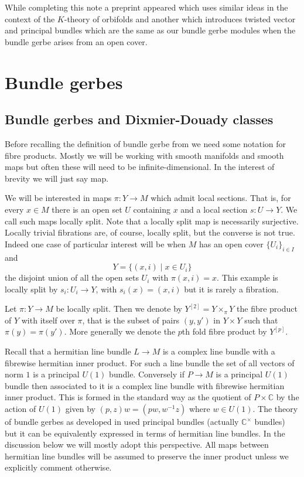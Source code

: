 \documentclass[a4paper,reqno]{amsart}
\theoremstyle{plain}
\theoremstyle{definition}
\theoremstyle{remark}
\numberwithin{equation}{section}
\numberwithin{figure}{section}
\newcommand{\CC}{{\mathbb C}}
\newcommand{\<}{\langle}
\renewcommand{\>}{\rangle}
\begin{document}
While completing this note a preprint \cite{LupUri} appeared which
uses similar ideas in the context of the $K$-theory of orbifolds and
another \cite{Mac} which introduces twisted vector and principal
bundles which are the same as our bundle gerbe modules when the bundle
gerbe arises from an open cover.


\section{Bundle gerbes}
\label{bundle_gerbes}

\subsection{Bundle gerbes and Dixmier-Douady classes}

Before recalling the definition of bundle gerbe from \cite{Mur} we
need some notation for fibre products.  Mostly we will be working with
smooth manifolds and smooth maps but often these will need to be
infinite-dimensional. In the interest of brevity we will just say map.


We will be interested in maps  $\pi \colon Y \to M$ which admit local
sections.  That is, for every $x \in M$ there is an open set $U  $
containing $x$ and  a local section $s \colon U \to Y$.
          We call such maps locally split.   Note that a locally split map is
necessarily
surjective.  
Locally trivial fibrations are, of course, locally split, but the
converse is not true. Indeed one case of particular
interest will be when $M$ has an open cover $\{U_i \}_{i \in I}$ and
$$
Y = \{ (x, i) \mid x \in U_i \}
$$
the
disjoint union of all the open sets $U_i$ with $\pi(x, i) =x$.
          This example is locally split by $s_i \colon U_i \to Y$, with
$s_i(x) = (x, i)$ but it is rarely a fibration.


Let $\pi \colon Y \to M$ be locally split. Then we denote by
          $Y^{[2]} = Y\times_\pi Y$ the fibre product
of $Y$ with itself over $\pi$,
          that is the subset of pairs $(y, y')$ in
$Y \times Y$ such that $\pi(y) = \pi(y')$.  More generally we denote
the $p$th fold fibre product by $Y^{[p]}$.

Recall that a hermitian line bundle  $L \to M$ is a complex line
bundle with a fibrewise
hermitian inner product. For such a line bundle the set of all
vectors of norm $1$ is
a principal $U(1)$ bundle. Conversely if $P \to M$ is a principal
$U(1)$ bundle then associated to it is a complex
line bundle with fibrewise hermitian inner product.  This is
formed in the standard way as the quotient of $P \times \CC$ by the
action of $U(1)$ given by $(p, z)w = (pw, w^{-1}z)$ where $w \in U(1)$.
       The theory of
bundle gerbes as developed in \cite{Mur} used principal bundles
(actually $\CC^\times$ bundles) but it can be equivalently
expressed in terms of hermitian line bundles. In the
discussion below we will mostly adopt this perspective.
All maps between hermitian line bundles will be assumed
to preserve the inner product unless we explicitly comment otherwise.
\end{document}
